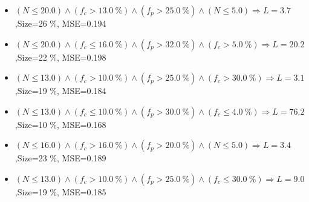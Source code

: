 \documentclass[numbered]{CSL}
\begin{document}
\begin{itemize}
\item $(N \leq 20.0) \land (f_c > 13.0~\%) \land (f_p > 25.0~\%) \land (N \leq 5.0) \Rightarrow L = 3.7$,\hfill Size=26 \%, MSE=0.194
\item $(N \leq 20.0) \land (f_c \leq 16.0~\%) \land (f_p > 32.0~\%) \land (f_c > 5.0~\%) \Rightarrow L = 20.2$,\hfill Size=22 \%, MSE=0.198
\item $(N \leq 13.0) \land (f_c > 10.0~\%) \land (f_p > 25.0~\%) \land (f_c > 30.0~\%) \Rightarrow L = 3.1$,\hfill Size=19 \%, MSE=0.184
\item $(N \leq 13.0) \land (f_c \leq 10.0~\%) \land (f_p > 30.0~\%) \land (f_c \leq 4.0~\%) \Rightarrow L = 76.2$,\hfill Size=10 \%, MSE=0.168
\item $(N \leq 16.0) \land (f_c > 16.0~\%) \land (f_p > 20.0~\%) \land (N \leq 5.0) \Rightarrow L = 3.4$,\hfill Size=23 \%, MSE=0.189
\item $(N \leq 13.0) \land (f_c > 10.0~\%) \land (f_p > 25.0~\%) \land (f_c \leq 30.0~\%) \Rightarrow L = 9.0$,\hfill Size=19 \%, MSE=0.185
\end{itemize}
\end{document}

